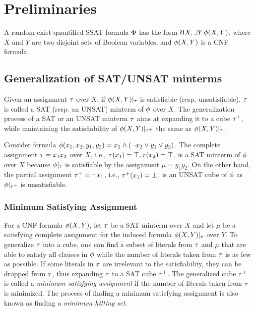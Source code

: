 \section{Preliminaries}
\label{sect:ressat-preliminaries}

A random-exist quantified SSAT formula $\Phi$ has the form $\random{} X,\exists Y.\pf(X,Y)$,
where $X$ and $Y$ are two disjoint sets of Boolean variables,
and $\phi(X,Y)$ is a CNF formula.

\subsection{Generalization of SAT/UNSAT minterms}
\label{sect:ressat-generalize}

Given an assignment $\tau$ over $X$,
if $\phi(X,Y)|_{\tau}$ is satisfiable (resp. unsatisfiable),
$\tau$ is called a SAT (resp. an UNSAT) minterm of $\phi$ over $X$.
The generalization process of a SAT or an UNSAT minterm $\tau$ aims at expanding it to a cube $\tau^+$,
while maintaining the satisfiability of $\phi(X,Y)|_{\tau^+}$ the same as $\phi(X,Y)|_{\tau}$.
\begin{example}
    \label{ex:ressat-assign}
    Consider formula $\phi(x_1,x_2,y_1,y_2)=x_1 \land (\lnot x_2 \lor y_1 \lor y_2)$.
    The complete assignment $\tau = x_1 x_2$ over $X$, i.e., $\tau(x_1)=\top, \tau(x_2)=\top$,
    is a SAT minterm of $\phi$ over $X$ because $\phi|_{\tau}$ is satisfiable by the assignment $\mu = y_1y_2$.
    On the other hand, the partial assignment $\tau^+ = \lnot x_1$, i.e., $\tau^+(x_1)=\bot$,
    is an UNSAT cube of $\phi$ as $\phi|_{\tau^+}$ is unsatisfiable.
\end{example}

\subsubsection{Minimum Satisfying Assignment}
For a CNF formula $\phi(X,Y)$,
let $\tau$ be a SAT minterm over $X$ and let $\mu$ be a satisfying complete assignment for the induced formula $\phi(X,Y)|_{\tau}$ over $Y$.
To generalize $\tau$ into a cube, one can find a subset of literals from $\tau$ and $\mu$ that are able to satisfy all clauses in $\phi$ while the number of literals taken from $\tau$ is as few as possible.
If some literals in $\tau$ are irrelevant to the satisfiability,
they can be dropped from $\tau$, thus expanding $\tau$ to a SAT cube $\tau^+$.
The generalized cube $\tau^+$ is called a \textit{minimum satisfying assignment} if the number of literals taken from $\tau$ is minimized.
The process of finding a minimum satisfying assignment is also known as finding a \textit{minimum hitting set}.

